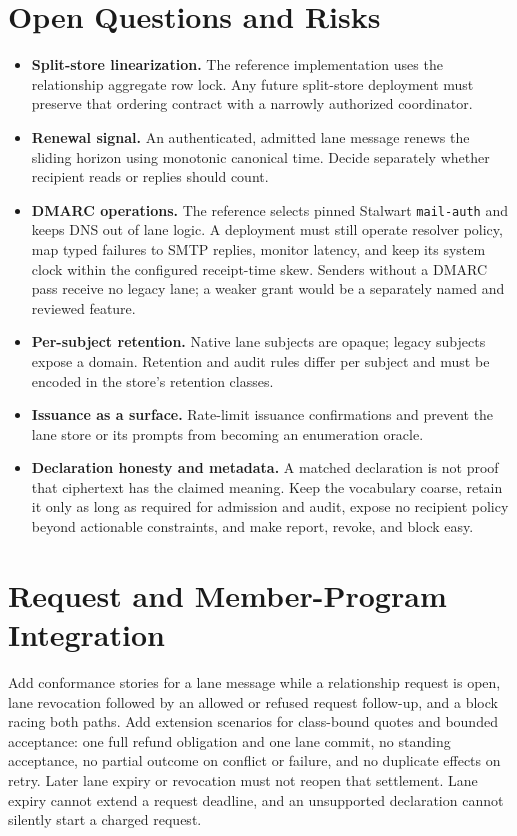 \documentclass[11pt]{article}
\begin{document}
\section{Open Questions and Risks}

\begin{itemize}[leftmargin=2em]
    \item \textbf{Split-store linearization.} The reference implementation uses
    the relationship aggregate row lock. Any future split-store deployment must
    preserve that ordering contract with a narrowly authorized coordinator.
    \item \textbf{Renewal signal.} An authenticated, admitted lane message renews
    the sliding horizon using monotonic canonical time. Decide separately whether
    recipient reads or replies should count.
    \item \textbf{DMARC operations.} The reference selects pinned Stalwart
    \texttt{mail-auth} and keeps DNS out of lane logic. A deployment must still
    operate resolver policy, map typed failures to SMTP replies, monitor latency,
    and keep its system clock within the configured receipt-time skew. Senders
    without a DMARC pass receive no legacy lane; a weaker grant would be a
    separately named and reviewed feature.
    \item \textbf{Per-subject retention.} Native lane subjects are opaque; legacy
    subjects expose a domain. Retention and audit rules differ per subject and
    must be encoded in the store's retention classes.
    \item \textbf{Issuance as a surface.} Rate-limit issuance confirmations and
    prevent the lane store or its prompts from becoming an enumeration oracle.
    \item \textbf{Declaration honesty and metadata.} A matched declaration is not
    proof that ciphertext has the claimed meaning. Keep the vocabulary coarse,
    retain it only as long as required for admission and audit, expose no recipient
    policy beyond actionable constraints, and make report, revoke, and block easy.
\end{itemize}

\section{Request and Member-Program Integration}

Add conformance stories for a lane message while a relationship request is open,
lane revocation followed by an allowed or refused request follow-up, and a block
racing both paths. Add extension scenarios for class-bound quotes and bounded
acceptance: one full refund obligation and one lane commit, no standing acceptance,
no partial outcome on conflict or failure, and no duplicate effects on retry.
Later lane expiry or revocation must not reopen that settlement. Lane expiry
cannot extend a request deadline, and an unsupported
declaration cannot silently start a charged request.
\end{document}
